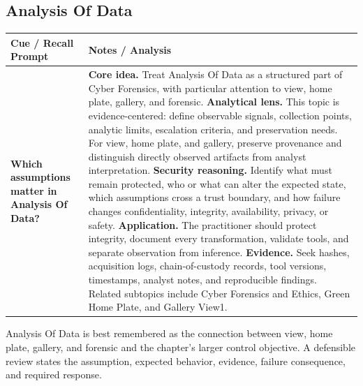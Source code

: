 \documentclass[11pt]{article}
\newcommand{\CornellHeader}{%
\rowcolor{Navy}\color{white}\bfseries Cue / Recall Prompt & \color{white}\bfseries Notes / Analysis\\\hline}
\newcommand{\CornellRow}[2]{%
\cellcolor{CueGray}\RaggedRight\textbf{#1} & \RaggedRight #2\\\hline}
\begin{document}
\subsection*{Analysis Of Data}
\begin{longtable}{>{\RaggedRight\arraybackslash}p{}|>{\RaggedRight\arraybackslash}p{}}
\CornellHeader
\CornellRow{Which assumptions matter in Analysis Of Data?}{\textbf{Core idea.} Treat Analysis Of Data as a structured part of Cyber Forensics, with particular attention to view, home plate, gallery, and forensic. \textbf{Analytical lens.} This topic is evidence-centered: define observable signals, collection points, analytic limits, escalation criteria, and preservation needs. For view, home plate, and gallery, preserve provenance and distinguish directly observed artifacts from analyst interpretation. \textbf{Security reasoning.} Identify what must remain protected, who or what can alter the expected state, which assumptions cross a trust boundary, and how failure changes confidentiality, integrity, availability, privacy, or safety. \textbf{Application.} The practitioner should protect integrity, document every transformation, validate tools, and separate observation from inference. \textbf{Evidence.} Seek hashes, acquisition logs, chain-of-custody records, tool versions, timestamps, analyst notes, and reproducible findings. Related subtopics include Cyber Forensics and Ethics, Green Home Plate, and Gallery View1.}
\end{longtable}
\begin{topicsummary}
Analysis Of Data is best remembered as the connection between view, home plate, gallery, and forensic and the chapter's larger control objective. A defensible review states the assumption, expected behavior, evidence, failure consequence, and required response.
\end{topicsummary}
\end{document}
